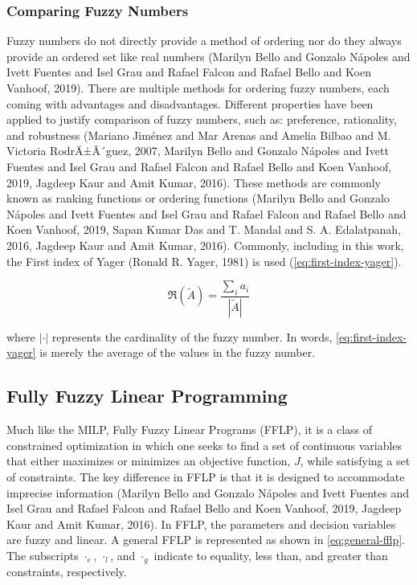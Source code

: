 \documentclass[11pt,a4paper,final]{article}
\begin{document}
\subsubsection{Comparing Fuzzy Numbers}
\label{sec:orge872dd6}
Fuzzy numbers do not directly provide a method of ordering nor do they always provide an ordered set like real numbers
(Marilyn Bello and Gonzalo N{\'a}poles and Ivett Fuentes and Isel Grau and Rafael Falcon and Rafael Bello and Koen Vanhoof, 2019). There are multiple methods for ordering fuzzy numbers, each coming with advantages and
disadvantages. Different properties have been applied to justify comparison of fuzzy numbers, such as: preference,
rationality, and robustness (Mariano Jim{\'e}nez and Mar Arenas and Amelia Bilbao and M. Victoria RodrÄ±Â´guez, 2007, Marilyn Bello and Gonzalo N{\'a}poles and Ivett Fuentes and Isel Grau and Rafael Falcon and Rafael Bello and Koen Vanhoof, 2019, Jagdeep Kaur and Amit Kumar, 2016). These
methods are commonly known as ranking functions or ordering functions
(Marilyn Bello and Gonzalo N{\'a}poles and Ivett Fuentes and Isel Grau and Rafael Falcon and Rafael Bello and Koen Vanhoof, 2019, Sapan Kumar Das and T. Mandal and S. A. Edalatpanah, 2016, Jagdeep Kaur and Amit Kumar, 2016). Commonly, including in this work, the First
index of Yager (Ronald R. Yager, 1981) is used (\ref{eq:first-index-yager}).

\begin{equation}
\label{eq:first-index-yager}
\mathfrak{R}(\tilde{A}) = \frac{\sum_i a_i}{|\tilde{A}|}
\end{equation}

\noindent
where \(|\cdot|\) represents the cardinality of the fuzzy number. In words, \ref{eq:first-index-yager} is merely the average
of the values in the fuzzy number.

\subsection{Fully Fuzzy Linear Programming}
\label{sec:orgd23f018}
Much like the MILP, Fully Fuzzy Linear Programs (FFLP), it is a class of constrained optimization in which one seeks to
find a set of continuous variables that either maximizes or minimizes an objective function, \(J\), while satisfying a set
of constraints. The key difference in FFLP is that it is designed to accommodate imprecise information
(Marilyn Bello and Gonzalo N{\'a}poles and Ivett Fuentes and Isel Grau and Rafael Falcon and Rafael Bello and Koen Vanhoof, 2019, Jagdeep Kaur and Amit Kumar, 2016). In FFLP, the parameters and decision variables are fuzzy and
linear. A general FFLP is represented as shown in \ref{eq:general-fflp}. The subscripts \(\cdot_e\), \(\cdot_l\), and \(\cdot_g\) indicate to
equality, less than, and greater than constraints, respectively.
\end{document}
